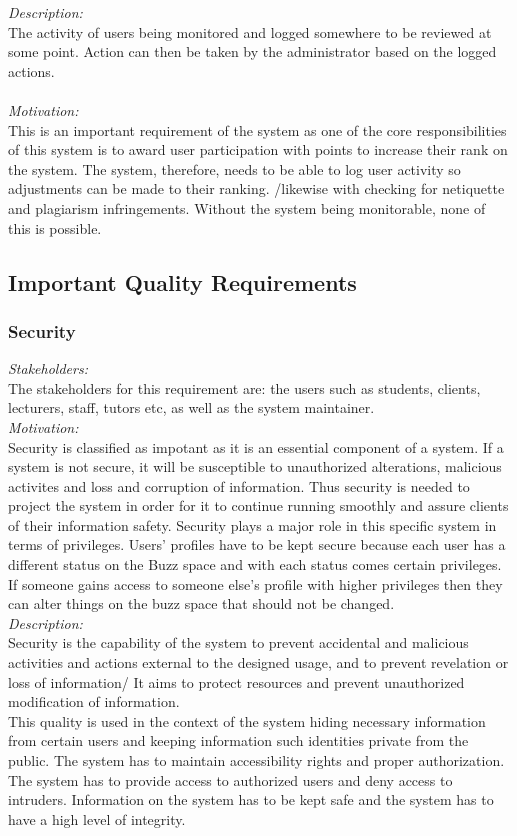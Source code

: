 \documentclass[a4paper,12pt]{report}
\begin{document}
		\emph{Description: }\\ The activity of users being monitored and logged somewhere to be reviewed at some point. Action can then be taken by the administrator based on the logged actions. \\	
		\\\emph{Motivation: }\\ This is an important requirement of the system as one of the core responsibilities of this system is to award user participation with points to increase their rank on the system. The system, therefore, needs to be able to log user activity so adjustments can be made to their ranking. /likewise with checking for netiquette and plagiarism infringements. Without the system being monitorable, none of this is possible. \\
		
	\subsection{Important Quality Requirements}
		\subsubsection{Security}
		\emph{Stakeholders: }\\ The stakeholders for this requirement are: the users such as students, clients, lecturers, staff, tutors etc,  as well as the system maintainer.\\
		
		\emph{Motivation: }\\ Security is classified as impotant as it is an essential component of a system. If a system is not secure, it will be susceptible to unauthorized alterations, malicious activites and loss and corruption of information. Thus security is needed to project the system in order for it to continue running smoothly and assure clients of their information safety. Security plays a major role in this specific system in terms of privileges. Users' profiles have to be kept secure because each user has a different status on the Buzz space and with each status comes certain privileges. If someone gains access to someone else's profile with higher privileges then they can alter things on the buzz space that should not be changed. \\
		
		\emph{Description: }\\ Security is the capability of the system to prevent accidental  and malicious activities and actions external to the designed usage, and to prevent revelation or loss of information/ It aims to protect resources and prevent unauthorized modification of information.\\
		This quality is used in the context of the system hiding necessary information from certain users and keeping information such identities private from the public. The system has to maintain accessibility rights and proper authorization. The system has to provide access to authorized users and deny access to intruders. Information on the system has to be kept safe and the system has to have a high level of integrity.\\
		
\end{document}
